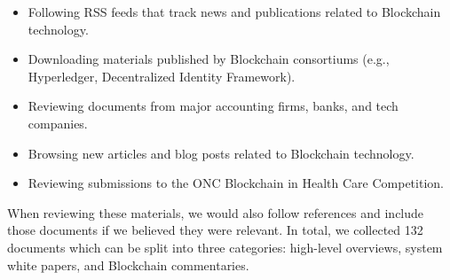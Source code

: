 \begin{itemize}
	\item Following RSS feeds that track news and publications related to 
	Blockchain technology.%
	\item Downloading materials published by Blockchain consortiums (e.g., 
	Hyperledger, Decentralized Identity Framework).%
	\item Reviewing documents from major accounting firms, banks, and tech companies.
	\item Browsing new articles and blog posts related to Blockchain technology.%
	\item Reviewing submissions to the ONC Blockchain in Health Care Competition.
\end{itemize}

When reviewing these materials, we would also follow references and include those documents if we believed they were relevant.
In total, we collected 132 documents which can be split into three categories: high-level overviews, system white papers, and Blockchain commentaries.


